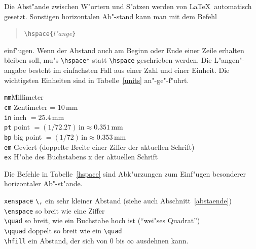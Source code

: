 Die Abst"ande zwischen W"ortern und S"atzen werden von \LaTeX\ 
automatisch gesetzt.
Sonstigen horizontalen Ab"-stand kann man mit dem Befehl
\begin{verse}
\verb|\hspace{|\textit{l"ange}\verb|}|
\end{verse}
einf"ugen.
Wenn der Abstand auch am Beginn oder Ende einer Zeile
erhalten bleiben soll, mu"s \verb|\hspace*| statt \verb|\hspace|
geschrieben werden.
Die L"angen"-angabe besteht im einfachsten Fall aus einer Zahl
und einer Einheit.  Die wichtigsten Einheiten sind in
Tabelle~\ref{units} an"-ge"-f"uhrt.
\begin{table}[b]
\caption{Einheiten f"ur L"angenangaben} \label{units}
\oben{11cm}
\begin{tabbing}
\texttt{mm}\qquad \= Millimeter                               \\
\texttt{cm} \> Zentimeter = 10\,mm                            \\
\texttt{in} \> inch \(= 25.4\,\mathrm{mm} \)                  \\
\texttt{pt} \> point \( =(1/72.27)\,\mathrm{in}
                        \approx 0.351\,\mathrm{mm}\)          \\
\texttt{bp} \> big point \( =(1/72)\,\mathrm{in}
                            \approx 0.353\,\mathrm{mm} \)      \\
\texttt{em} \> Geviert (doppelte Breite einer Ziffer der aktuellen Schrift)\\
\texttt{ex} \> H"ohe des Buchstabens x der aktuellen Schrift
\end{tabbing}                    
\unten
\end{table}
Die Befehle in Tabelle~\ref{hspace} sind Abk"urzungen zum Einf"ugen
besonderer horizontaler Ab"-st"ande.
\begin{table}[t]
\caption{Befehle f"ur horizontale Abst"ande} \label{hspace}
\oben{13cm}
\begin{tabbing}
\texttt{xenspace}\qquad \= \kill
\verb|\,|       \> ein sehr kleiner Abstand (siehe auch Abschnitt~\ref{abstaende})\\
\verb|\enspace| \> so breit wie eine Ziffer \\
\verb|\quad|    \> so breit, wie ein Buchstabe hoch ist
                   ("`wei"ses Quadrat"') \\
\verb|\qquad|   \> doppelt so breit wie ein \verb|\quad| \\
\verb|\hfill|   \> ein Abstand, der sich von 0 bis \(\infty\)
                   ausdehnen kann.
\end{tabbing}
\unten
\end{table}
